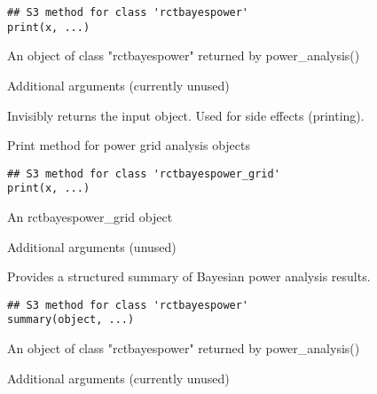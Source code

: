 \documentclass[letterpaper]{book}
\begin{document}
%
\begin{Usage}
\begin{verbatim}
## S3 method for class 'rctbayespower'
print(x, ...)
\end{verbatim}
\end{Usage}
%
\begin{Arguments}
\begin{ldescription}
\item[\code{x}] An object of class "rctbayespower" returned by power\_analysis()

\item[\code{...}] Additional arguments (currently unused)
\end{ldescription}
\end{Arguments}
%
\begin{Value}
Invisibly returns the input object. Used for side effects (printing).
\end{Value}
%
\begin{Description}
Print method for power grid analysis objects
\end{Description}
%
\begin{Usage}
\begin{verbatim}
## S3 method for class 'rctbayespower_grid'
print(x, ...)
\end{verbatim}
\end{Usage}
%
\begin{Arguments}
\begin{ldescription}
\item[\code{x}] An rctbayespower\_grid object

\item[\code{...}] Additional arguments (unused)
\end{ldescription}
\end{Arguments}
%
\begin{Description}
Provides a structured summary of Bayesian power analysis results.
\end{Description}
%
\begin{Usage}
\begin{verbatim}
## S3 method for class 'rctbayespower'
summary(object, ...)
\end{verbatim}
\end{Usage}
%
\begin{Arguments}
\begin{ldescription}
\item[\code{object}] An object of class "rctbayespower" returned by power\_analysis()

\item[\code{...}] Additional arguments (currently unused)
\end{ldescription}
\end{Arguments}
\end{document}
